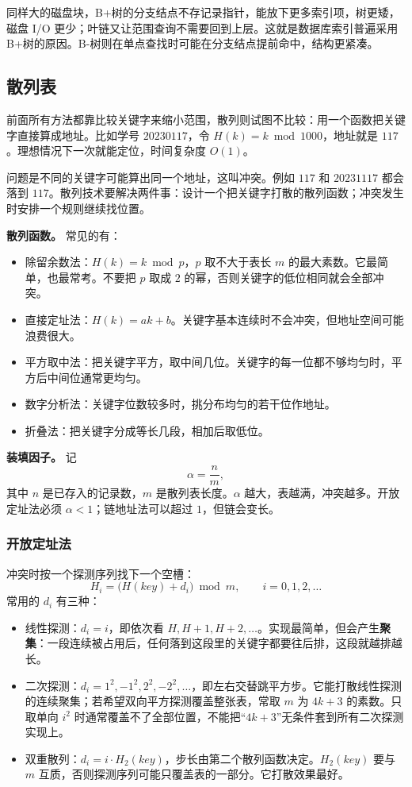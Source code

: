 同样大的磁盘块，B+树的分支结点不存记录指针，能放下更多索引项，树更矮，磁盘 I/O 更少；叶链又让范围查询不需要回到上层。这就是数据库索引普遍采用 B+树的原因。B-树则在单点查找时可能在分支结点提前命中，结构更紧凑。

\subsection{散列表}

前面所有方法都靠比较关键字来缩小范围，散列则试图不比较：用一个函数把关键字直接算成地址。比如学号 $20230117$，令 $H(k)=k\bmod 1000$，地址就是 $117$。理想情况下一次就能定位，时间复杂度 $O(1)$。

问题是不同的关键字可能算出同一个地址，这叫冲突。例如 $117$ 和 $20231117$ 都会落到 $117$。散列技术要解决两件事：设计一个把关键字打散的散列函数；冲突发生时安排一个规则继续找位置。

\textbf{散列函数。} 常见的有：
\begin{itemize}
  \item 除留余数法：$H(k)=k\bmod p$，$p$ 取不大于表长 $m$ 的最大素数。它最简单，也最常考。不要把 $p$ 取成 $2$ 的幂，否则关键字的低位相同就会全部冲突。
  \item 直接定址法：$H(k)=a k+b$。关键字基本连续时不会冲突，但地址空间可能浪费很大。
  \item 平方取中法：把关键字平方，取中间几位。关键字的每一位都不够均匀时，平方后中间位通常更均匀。
  \item 数字分析法：关键字位数较多时，挑分布均匀的若干位作地址。
  \item 折叠法：把关键字分成等长几段，相加后取低位。
\end{itemize}

\textbf{装填因子。} 记
\[
\alpha=\frac{n}{m},
\]
其中 $n$ 是已存入的记录数，$m$ 是散列表长度。$\alpha$ 越大，表越满，冲突越多。开放定址法必须 $\alpha<1$；链地址法可以超过 $1$，但链会变长。

\subsubsection{开放定址法}

冲突时按一个探测序列找下一个空槽：
\[
H_i=\bigl(H(key)+d_i\bigr)\bmod m,\qquad i=0,1,2,\ldots
\]
常用的 $d_i$ 有三种：

\begin{itemize}
  \item 线性探测：$d_i=i$，即依次看 $H,H+1,H+2,\ldots$。实现最简单，但会产生\textbf{聚集}：一段连续被占用后，任何落到这段里的关键字都要往后排，这段就越排越长。
  \item 二次探测：$d_i=1^2,-1^2,2^2,-2^2,\ldots$，即左右交替跳平方步。它能打散线性探测的连续聚集；若希望双向平方探测覆盖整张表，常取 $m$ 为 $4k+3$ 的素数。只取单向 $i^2$ 时通常覆盖不了全部位置，不能把“$4k+3$”无条件套到所有二次探测实现上。
  \item 双重散列：$d_i=i\cdot H_2(key)$，步长由第二个散列函数决定。$H_2(key)$ 要与 $m$ 互质，否则探测序列可能只覆盖表的一部分。它打散效果最好。
\end{itemize}

